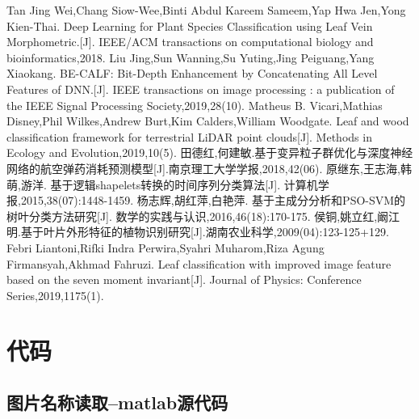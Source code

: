 \documentclass{whutmod}
\begin{document}
    
	\newpage	%
	\nocite{*}		%
%
%	
\begin{thebibliography}{9}%
	 Tan Jing Wei,Chang Siow-Wee,Binti Abdul Kareem Sameem,Yap Hwa Jen,Yong Kien-Thai. Deep Learning for Plant Species Classification using Leaf Vein Morphometric.[J]. IEEE/ACM transactions on computational biology and bioinformatics,2018.
	Liu Jing,Sun Wanning,Su Yuting,Jing Peiguang,Yang Xiaokang. BE-CALF: Bit-Depth Enhancement by Concatenating All Level Features of DNN.[J]. IEEE transactions on image processing : a publication of the IEEE Signal Processing Society,2019,28(10).
	Matheus B. Vicari,Mathias Disney,Phil Wilkes,Andrew Burt,Kim Calders,William Woodgate. Leaf and wood classification framework for terrestrial LiDAR point clouds[J]. Methods in Ecology and Evolution,2019,10(5).
	田德红,何建敏.基于变异粒子群优化与深度神经网络的航空弹药消耗预测模型[J].南京理工大学学报,2018,42(06).
	原继东,王志海,韩萌,游洋. 基于逻辑shapelets转换的时间序列分类算法[J]. 计算机学报,2015,38(07):1448-1459.
	杨志辉,胡红萍,白艳萍. 基于主成分分析和PSO-SVM的树叶分类方法研究[J]. 数学的实践与认识,2016,46(18):170-175.
	侯铜,姚立红,阚江明.基于叶片外形特征的植物识别研究[J].湖南农业科学,2009(04):123-125+129.
	Febri Liantoni,Rifki Indra Perwira,Syahri Muharom,Riza Agung Firmansyah,Akhmad Fahruzi. Leaf classification with improved image feature based on the seven moment invariant[J]. Journal of Physics: Conference Series,2019,1175(1).
\end{thebibliography}

	\newpage
	\appendix %

\section{代码}
\subsection{图片名称读取--matlab源代码}
\begin{lstlisting}[language=matlab]

\end{lstlisting}
\end{document}
